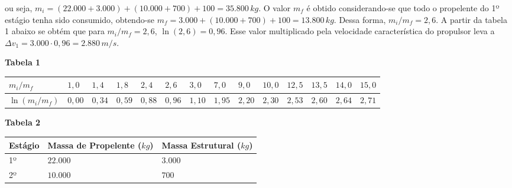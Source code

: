\documentclass[a4paper, 12pt]{article}
\begin{document}
\begin{flushleft}
\begin{itemize}
ou seja, $m_i = (22.000 + 3.000) + (10.000 + 700) + 100 = 35.800 \, kg$. O valor $m_f$ é obtido considerando-se que todo o propelente do 1º estágio tenha sido consumido, obtendo-se $m_f= 3.000 + (10.000 + 700) + 100 = 13.800 \, kg$. Dessa forma, $m_i/m_f=2,6$. A partir da tabela 1 abaixo se obtém que para $m_i/m_f=2,6$, $\ln(2,6) = 0,96$. Esse valor multiplicado pela velocidade característica do propulsor leva a $\Delta v_1= 3.000 · 0,96 = 2.880 \, m/s$.
                \begin{center}
                    \textbf{Tabela 1} \linebreak \linebreak
                    \begin{tabular}
                    {
                        |M{0.1\textwidth}|M{0.04\textwidth}|M{0.04\textwidth}|M{0.04\textwidth}|M{0.04\textwidth}|M{0.04\textwidth}|M{0.04\textwidth}|M{0.04\textwidth}|M{0.04\textwidth}|M{0.04\textwidth}|M{0.04\textwidth}|M{0.04\textwidth}|M{0.04\textwidth}|M{0.04\textwidth}|
                    }
                        \hline
                        $m_i/m_f$ & $1,0$ & $1,4$ & $1,8$ & $2,4$ & $2,6$ & $3,0$ & $7,0$ & $9,0$ & $10,0$ & $12,5$ & $13,5$ & $14,0$ & $15,0$ \\ \hline
                        $\ln (m_i/m_f)$ & $0,00$ & $0,34$ & $0,59$ & $0,88$ & $0,96$ & $1,10$ & $1,95$ & $2,20$ & $2,30$ & $2,53$ & $2,60$ & $2,64$ & $2,71$ \\ \hline
                    \end{tabular}
                \end{center}
                \begin{center}
                    \textbf{Tabela 2} \linebreak \linebreak
                    \begin{tabular}
                    {
                        |M{0.1\textwidth}|M{0.3\textwidth}|M{0.3\textwidth}|
                    }
                        \hline
                        Estágio & Massa de Propelente ($kg$) & Massa Estrutural ($kg$) \\ \hline
                        1º & $22.000$ & $3.000$ \\ \hline
                        2º & $10.000$ & $700$ \\ \hline
                    \end{tabular}
                \end{center}
                \begin{itemize}

\end{itemize}
\end{itemize}
\end{flushleft}
\end{document}
